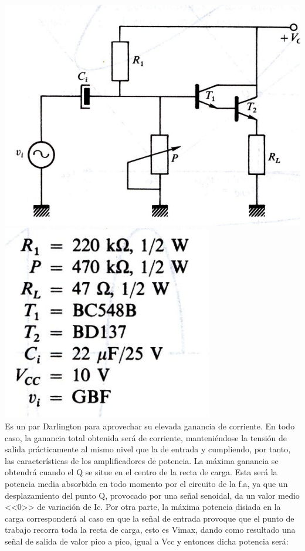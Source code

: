 \documentclass[10pt,a4paper]{article}
\begin{document}
\includegraphics[scale=.40]{cir.png}  \includegraphics[scale=.30]{circu.png}\\ 
Es un par Darlington para aprovechar su elevada ganancia de corriente. En todo caso, la ganancia total obtenida será de corriente, manteniéndose la tensión de salida prácticamente al mismo nivel que la de entrada y cumpliendo, por tanto, las características de los amplificadores de  potencia.
La máxima ganancia se obtendrá cuando el Q se situe en el centro de la recta de carga. Esta será la potencia media absorbida en todo momento por el circuito de la f.a, ya que un desplazamiento del punto Q, provocado por una señal senoidal, da un valor medio <<0>> de variación de Ic.
Por otra parte, la máxima potencia disiada en la carga corresponderá al caso en que la señal de entrada provoque que el punto de trabajo recorra toda la recta de carga, esto es Vimax, dando como resultado una señal de salida de valor pico a pico, igual a Vcc y entonces dicha potencia será:\\ 
\end{document}

